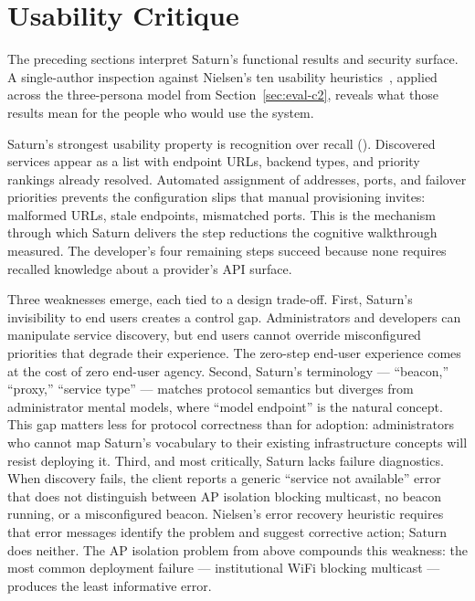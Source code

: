 \section{Usability Critique}
\label{sec:usability-critique}

The preceding sections interpret Saturn's functional results and security surface. A single-author inspection against Nielsen's ten usability heuristics~\cite{nielsen1994heuristics}, applied across the three-persona model from Section~\ref{sec:eval-c2}, reveals what those results mean for the people who would use the system.

Saturn's strongest usability property is recognition over recall (). Discovered services appear as a list with endpoint URLs, backend types, and priority rankings already resolved. Automated assignment of addresses, ports, and failover priorities prevents the configuration slips that manual provisioning invites: malformed URLs, stale endpoints, mismatched ports. This is the mechanism through which Saturn delivers the step reductions the cognitive walkthrough measured. The developer's four remaining steps succeed because none requires recalled knowledge about a provider's API surface.

Three weaknesses emerge, each tied to a design trade-off. First, Saturn's invisibility to end users creates a control gap. Administrators and developers can manipulate service discovery, but end users cannot override misconfigured priorities that degrade their experience. The zero-step end-user experience comes at the cost of zero end-user agency. Second, Saturn's terminology --- ``beacon,'' ``proxy,'' ``service type'' --- matches protocol semantics but diverges from administrator mental models, where ``model endpoint'' is the natural concept. This gap matters less for protocol correctness than for adoption: administrators who cannot map Saturn's vocabulary to their existing infrastructure concepts will resist deploying it. Third, and most critically, Saturn lacks failure diagnostics. When discovery fails, the client reports a generic ``service not available'' error that does not distinguish between AP isolation blocking multicast, no beacon running, or a misconfigured beacon. Nielsen's error recovery heuristic requires that error messages identify the problem and suggest corrective action; Saturn does neither. The AP isolation problem from above compounds this weakness: the most common deployment failure --- institutional WiFi blocking multicast --- produces the least informative error.

